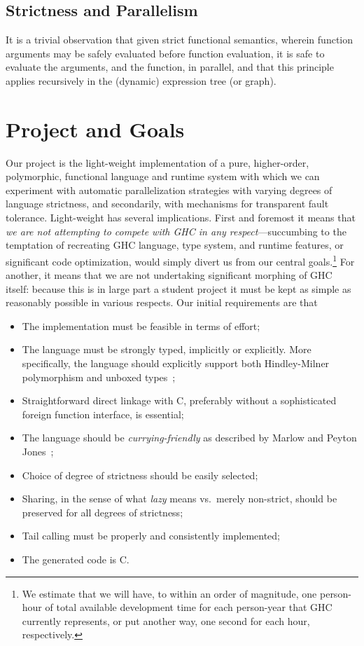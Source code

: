 \documentclass{llncs}
\begin{document}
\subsection{Strictness and Parallelism}
It is a trivial observation that given strict functional semantics, wherein
function arguments may be safely evaluated before function evaluation, it is
safe to evaluate the arguments, and the function, in parallel, and that this
principle applies recursively in the (dynamic) expression tree (or graph).

\section{Project and Goals}
Our project is the light-weight implementation of a pure, higher-order,
polymorphic, functional language and runtime system with which we can
experiment with automatic parallelization strategies with varying degrees of
language strictness, and secondarily, with mechanisms for transparent fault
tolerance.  Light-weight has several implications.  First and foremost it
means that \emph{we are not attempting to compete with GHC in any
  respect}---succumbing to the temptation of recreating GHC language, type
system, and runtime features, or significant code optimization, would simply
divert us from our central goals.\footnote{We estimate that we will have, to
  within an order of magnitude, one person-hour of total available development
  time for each person-year that GHC currently represents, or put another way,
  one second for each hour, respectively.}  For another, it means that we are
not undertaking significant morphing of GHC itself: because this is in large
part a student project it must be kept as simple as reasonably possible in
various respects.  Our initial requirements are that
\begin{itemize}
\item The implementation must be feasible in terms of effort;
\item The language must be strongly typed, implicitly or explicitly.  More
  specifically, the language should explicitly support both Hindley-Milner
  polymorphism and unboxed types~\cite{Jones:1991};
\item Straightforward direct linkage with C, preferably without a sophisticated
  foreign function interface, is essential;
  \item The language should be \emph{currying-friendly} as described by Marlow
and Peyton Jones~\cite{Marlow:2004};
\item Choice of degree of strictness should be easily selected;
\item Sharing, in the sense of what \emph{lazy} means vs.\ merely non-strict,
  should be preserved for all degrees of strictness;
\item Tail calling must be properly and consistently implemented;
\item The generated code is C.
\end{itemize}
\end{document}
